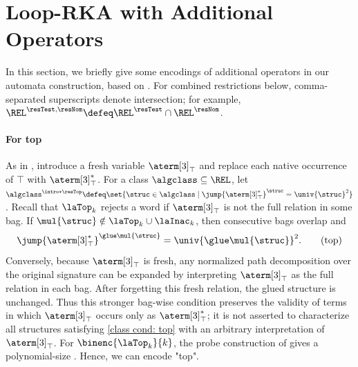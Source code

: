 \section{Loop-RKA with Additional Operators}\label{section: encoding extras}
In this section,
we briefly give some encodings of additional operators in our automata construction, based on \cite{nakamuraDerivativesGraphsPositive2025}.
For combined restrictions below, comma-separated superscripts denote intersection; for example,
$\REL^{\resTest,\resNom}\defeq\REL^{\resTest}\cap\REL^{\resNom}$.
\paragraph*{For top}
As in , introduce a fresh variable $\aterm[3]_{\top}$
and replace each native occurrence of $\top$ with $\aterm[3]_{\top}^{*}$.
For a class $\algclass\subseteq\REL$, let
$\algclass^{\intro*\resTop}\defeq
\set{\struc\in\algclass\mid \jump{\aterm[3]_{\top}^{*}}^{\struc}=\univ{\struc}^{2}}$.
Recall that $\laTop_k$ rejects a word if $\aterm[3]_{\top}$ is not the full relation in some bag.
If $\mul{\struc} \notin \laTop_k \cup \laInac_k$, then consecutive bags overlap and
\[
\jump{\aterm[3]_{\top}^{*}}^{\glue\mul{\struc}}=\univ{\glue\mul{\struc}}^2.
\tag{top}\label{class cond: top}
\]
Conversely, because $\aterm[3]_{\top}$ is fresh, any normalized path decomposition over the original signature
can be expanded by interpreting $\aterm[3]_{\top}$ as the full relation in each bag.
After forgetting this fresh relation, the glued structure is unchanged.
Thus this stronger bag-wise condition preserves the validity of terms in which $\aterm[3]_{\top}$ occurs only as $\aterm[3]_{\top}^{*}$;
it is not asserted to characterize all structures satisfying \eqref{class cond: top} with an arbitrary interpretation of $\aterm[3]_{\top}$.
For $\binenc{\laTop_{k}}{k}$, the probe construction of
 gives a polynomial-size .
Hence, we can encode "top".

%
%
%
%

